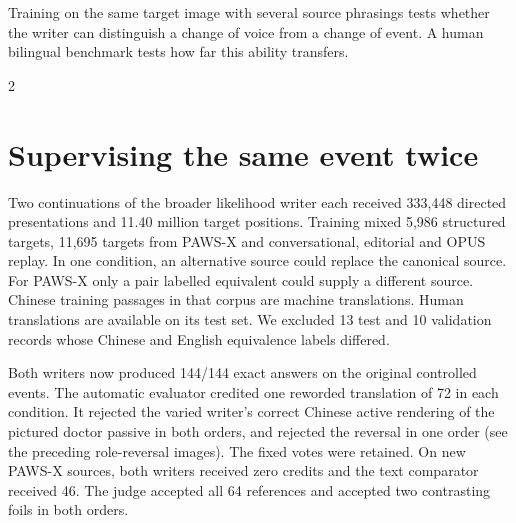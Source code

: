 \newpage
{}
\noindent Training on the same target image with several source phrasings tests whether the writer can distinguish a change of voice from a change of event. A human bilingual benchmark tests how far this ability transfers.
\begin{multicols}{2}
\section*{Supervising the same event twice}
Two continuations of the broader likelihood writer each received 333,448 directed presentations and 11.40 million target positions. Training mixed 5,986 structured targets, 11,695 targets from PAWS-X and conversational, editorial and OPUS replay. In one condition, an alternative source could replace the canonical source. For PAWS-X only a pair labelled equivalent could supply a different source. Chinese training passages in that corpus are machine translations. Human translations are available on its test set. We excluded 13 test and 10 validation records whose Chinese and English equivalence labels differed.
\par Both writers now produced 144/144 exact answers on the original controlled events. The automatic evaluator credited one reworded translation of 72 in each condition. It rejected the varied writer's correct Chinese active rendering of the pictured doctor passive in both orders, and rejected the reversal in one order (see the preceding role-reversal images). The fixed votes were retained. On new PAWS-X sources, both writers received zero credits and the text comparator received 46. The judge accepted all 64 references and accepted two contrasting foils in both orders.

\end{multicols}
